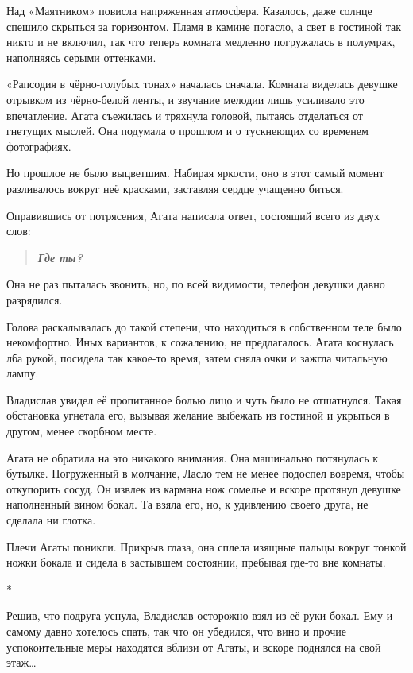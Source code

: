 \documentclass[
  a5paperpaper,
  DIV=11,
  numbers=noendperiod]{scrreprt}
\begin{document}

Над «Маятником» повисла напряженная атмосфера. Казалось, даже солнце
спешило скрыться за горизонтом. Пламя в камине погасло, а свет в
гостиной так никто и не включил, так что теперь комната медленно
погружалась в полумрак, наполняясь серыми оттенками.

«Рапсодия в чёрно-голубых тонах» началась сначала. Комната виделась
девушке отрывком из чёрно-белой ленты, и звучание мелодии лишь усиливало
это впечатление. Агата съежилась и тряхнула головой, пытаясь отделаться
от гнетущих мыслей. Она подумала о прошлом и о тускнеющих со временем
фотографиях.

Но прошлое не было выцветшим. Набирая яркости, оно в этот самый момент
разливалось вокруг неё красками, заставляя сердце учащенно биться.

Оправившись от потрясения, Агата написала ответ, состоящий всего из двух
слов:

\begin{quote}
\textbf{\emph{Где ты?}}
\end{quote}

Она не раз пыталась звонить, но, по всей видимости, телефон девушки
давно разрядился.

Голова раскалывалась до такой степени, что находиться в собственном теле
было некомфортно. Иных вариантов, к сожалению, не предлагалось. Агата
коснулась лба рукой, посидела так какое-то время, затем сняла очки и
зажгла читальную лампу.

Владислав увидел её пропитанное болью лицо и чуть было не отшатнулся.
Такая обстановка угнетала его, вызывая желание выбежать из гостиной и
укрыться в другом, менее скорбном месте.

Агата не обратила на это никакого внимания. Она машинально потянулась к
бутылке. Погруженный в молчание, Ласло тем не менее подоспел вовремя,
чтобы откупорить сосуд. Он извлек из кармана нож сомелье и вскоре
протянул девушке наполненный вином бокал. Та взяла его, но, к удивлению
своего друга, не сделала ни глотка.

Плечи Агаты поникли. Прикрыв глаза, она сплела изящные пальцы вокруг
тонкой ножки бокала и сидела в застывшем состоянии, пребывая где-то вне
комнаты.

*

Решив, что подруга уснула, Владислав осторожно взял из её руки бокал.
Ему и самому давно хотелось спать, так что он убедился, что вино и
прочие успокоительные меры находятся вблизи от Агаты, и вскоре поднялся
на свой этаж\ldots{}
\end{document}
